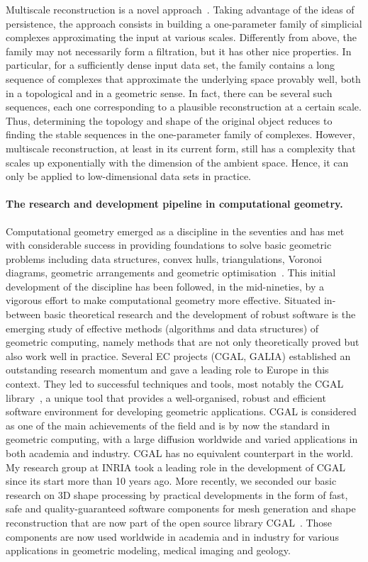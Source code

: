 Multiscale reconstruction is a novel approach~\cite{geometrica-bgo-09}. Taking advantage of the ideas of persistence, the approach consists in building a one-parameter family of simplicial complexes approximating the input at various scales. Differently from above, the family may not necessarily form a filtration, but it has other nice properties. In particular, for a sufficiently dense input data set, the family contains a long sequence of complexes that approximate the underlying space provably well, both in a topological and in a geometric sense. In fact, there can be several such sequences, each one corresponding to a plausible reconstruction at a certain scale. Thus, determining the topology and shape of the original object reduces to finding the stable sequences in the one-parameter family of complexes.   However, multiscale reconstruction, at least in its current form, still has a complexity that scales up exponentially with the dimension of the ambient space. Hence, it can only be applied to low-dimensional data sets in practice.


\paragraph{The research and development pipeline in computational geometry.}
Computational geometry emerged as a discipline in the seventies and has met with considerable success in providing foundations to solve basic geometric problems including data structures, convex hulls, triangulations, Voronoi diagrams, geometric arrangements and geometric optimisation~\cite{by-ag-98}. This initial development of the discipline has been followed, in the mid-nineties, by a vigorous effort to make computational geometry more effective.  Situated in-between basic theoretical research and the development of robust software is the emerging study of effective methods (algorithms and data structures) of geometric computing, namely methods that are not only theoretically proved but also work well in practice.  Several EC projects (CGAL, GALIA) established an outstanding research momentum and gave a leading role to Europe in this context.  They led to successful techniques and tools, most notably the CGAL library~\cite{cgal}, a unique tool that provides a well-organised, robust and efficient software environment for developing geometric applications. CGAL is considered as one of the main achievements of the field and is by now the standard in geometric computing, with a large diffusion worldwide and varied applications in both academia and industry. CGAL has no equivalent counterpart in the world.  My research group at INRIA took a leading role in the development of CGAL since its start more than 10 years ago. More recently, we seconded our basic research on  3D shape processing by practical developments in the form of fast, safe and quality-guaranteed software components for mesh generation and shape reconstruction that are now part of the open source library CGAL~\cite{cgal:rty-m3-11}. Those components are now used worldwide in academia and in industry for various applications in geometric modeling, medical imaging and geology.




